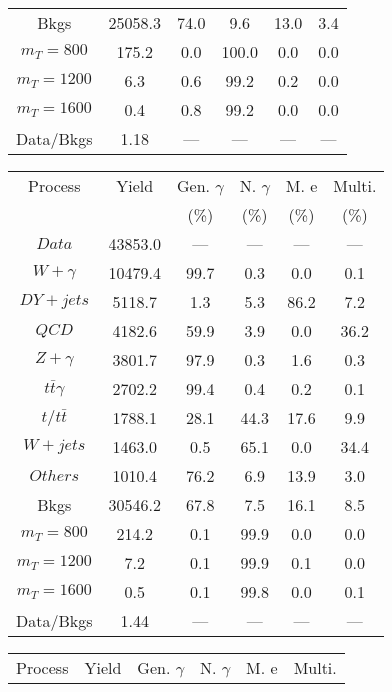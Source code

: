 \begin{figure}
\begin{minipage}[c]{0.32\textwidth}
{\begin{tabular}{cccccc}
Bkgs &  25058.3 &  74.0 &  9.6 &  13.0 &  3.4\\
$ m_{T} = 800 $ &  175.2 &  0.0 &  100.0 &  0.0 &  0.0\\
$ m_{T} = 1200 $ &  6.3 &  0.6 &  99.2 &  0.2 &  0.0\\
$ m_{T} = 1600 $ &  0.4 &  0.8 &  99.2 &  0.0 &  0.0\\
Data/Bkgs &  1.18 &  --- &  --- &  --- &  ---\\
\hline
\end{tabular}
}
\end{minipage}
\begin{minipage}[c]{0.32\textwidth}
\centering
\tiny{
\begin{tabular}{cccccc}
\hline
Process & Yield & Gen. $\gamma$ & N. $\gamma$ & M. e & Multi. \\
 &  & (\%) & (\%) & (\%) & (\%)  \\
\hline
                                                                      $ Data $ &  43853.0 &  --- &  --- &  --- &  ---\\
$ W+\gamma $ &  10479.4 &  99.7 &  0.3 &  0.0 &  0.1\\
$ DY+jets $ &  5118.7 &  1.3 &  5.3 &  86.2 &  7.2\\
$ QCD $ &  4182.6 &  59.9 &  3.9 &  0.0 &  36.2\\
$ Z+\gamma $ &  3801.7 &  97.9 &  0.3 &  1.6 &  0.3\\
$ t\bar{t}\gamma $ &  2702.2 &  99.4 &  0.4 &  0.2 &  0.1\\
$ t/t\bar{t} $ &  1788.1 &  28.1 &  44.3 &  17.6 &  9.9\\
$ W+jets $ &  1463.0 &  0.5 &  65.1 &  0.0 &  34.4\\
$ Others $ &  1010.4 &  76.2 &  6.9 &  13.9 &  3.0\\
Bkgs &  30546.2 &  67.8 &  7.5 &  16.1 &  8.5\\
$ m_{T} = 800 $ &  214.2 &  0.1 &  99.9 &  0.0 &  0.0\\
$ m_{T} = 1200 $ &  7.2 &  0.1 &  99.9 &  0.1 &  0.0\\
$ m_{T} = 1600 $ &  0.5 &  0.1 &  99.8 &  0.0 &  0.1\\
Data/Bkgs &  1.44 &  --- &  --- &  --- &  ---\\
\hline
\end{tabular}
}
\end{minipage}
\begin{minipage}[c]{0.32\textwidth}
\centering
\tiny{
\begin{tabular}{cccccc}
\hline
Process & Yield & Gen. $\gamma$ & N. $\gamma$ & M. e & Multi. \\

\end{tabular}}
\end{minipage}
\end{figure}
